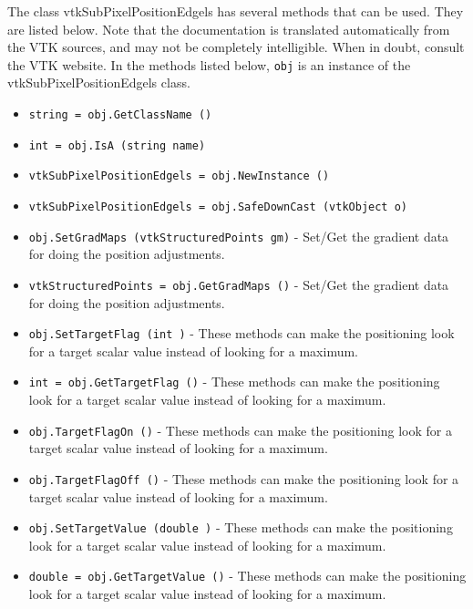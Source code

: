 The class vtkSubPixelPositionEdgels has several methods that can be used.
  They are listed below.
Note that the documentation is translated automatically from the VTK sources,
and may not be completely intelligible.  When in doubt, consult the VTK website.
In the methods listed below, \verb|obj| is an instance of the vtkSubPixelPositionEdgels class.
\begin{itemize}
\item  \verb|string = obj.GetClassName ()|

\item  \verb|int = obj.IsA (string name)|

\item  \verb|vtkSubPixelPositionEdgels = obj.NewInstance ()|

\item  \verb|vtkSubPixelPositionEdgels = obj.SafeDownCast (vtkObject o)|

\item  \verb|obj.SetGradMaps (vtkStructuredPoints gm)| -  Set/Get the gradient data for doing the position adjustments.

\item  \verb|vtkStructuredPoints = obj.GetGradMaps ()| -  Set/Get the gradient data for doing the position adjustments.

\item  \verb|obj.SetTargetFlag (int )| -  These methods can make the positioning look for a target scalar value
 instead of looking for a maximum.

\item  \verb|int = obj.GetTargetFlag ()| -  These methods can make the positioning look for a target scalar value
 instead of looking for a maximum.

\item  \verb|obj.TargetFlagOn ()| -  These methods can make the positioning look for a target scalar value
 instead of looking for a maximum.

\item  \verb|obj.TargetFlagOff ()| -  These methods can make the positioning look for a target scalar value
 instead of looking for a maximum.

\item  \verb|obj.SetTargetValue (double )| -  These methods can make the positioning look for a target scalar value
 instead of looking for a maximum.

\item  \verb|double = obj.GetTargetValue ()| -  These methods can make the positioning look for a target scalar value
 instead of looking for a maximum.

\end{itemize}

